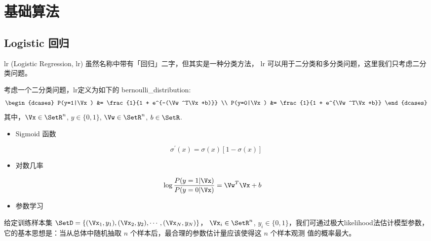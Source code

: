 \chapter{基础算法}
\label{chap:fundamental_algorithms}

\section{Logistic 回归}

\gls{lr} (Logistic Regression, lr) 虽然名称中带有「回归」二字，但其实是一种分类方法，
\gls{lr} 可以用于二分类和多分类问题，这里我们只考虑二分类问题。

考虑一个二分类问题，\gls{lr}定义为如下的 \gls{bernoulli_distribution}:
\begin{equation} \label{formula_lr}
	\begin{dcases}
		P(y=1|\Vx) &= \frac{1}{1 + e^{-(\Vw^T\Vx+b)}} \\
		P(y=0|\Vx) &= \frac{1}{1 + e^{\Vw^T\Vx+b}} 
	\end{dcases}
\end{equation}
其中，$\Vx \in \SetR^n$, $y \in \{0, 1\}$, $\Vw \in \SetR^n$, $b \in \SetR$.



\begin{itemize}
  \item Sigmoid 函数
\end{itemize}

\begin{equation}
	\sigma^{'}(x) = \sigma(x)[1-\sigma(x)]
\end{equation}


\begin{itemize}
  \item 对数几率
\end{itemize}

\begin{align}
	\log \frac{P(y=1|\Vx)}{P(y=0|\Vx)} &= \Vw^T\Vx+b
	\label{logistic_prob}
\end{align}


\begin{itemize}
  \item 参数学习
\end{itemize}

给定训练样本集 $\SetD = \{(\Vx_1, y_1), (\Vx_2, y_2), \cdots, (\Vx_N, y_N)\}$，
$\Vx_i \in \SetR^n$, $y_i \in \{0, 1\}$，我们可通过极大\gls{likelihood}法估计模型参数，
它的基本思想是：当从总体中随机抽取 $n$ 个样本后，最合理的参数估计量应该使得这 $n$ 个样本观测
值的概率最大。

